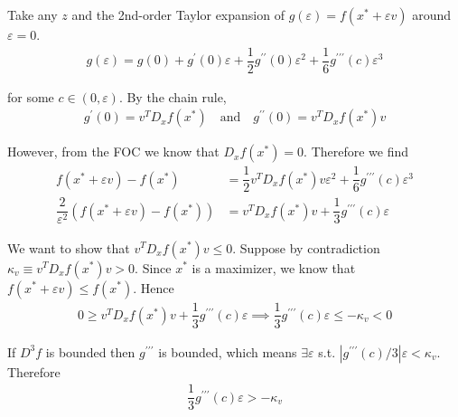 \documentclass{article}
\begin{document}
\begin{enumerate}[1.]
\begin{enumerate}[a)]
        \solution Take any $z$ and the 2nd-order Taylor expansion of $g(\varepsilon) = f(x^* + \varepsilon v)$ around $\varepsilon = 0$.
        \begin{align*}
          g(\varepsilon)
          =
          g(0)
          + g^\prime(0) \varepsilon
          + \dfrac{1}{2} g^{\prime\prime}(0) \varepsilon^2
          + \dfrac{1}{6} g^{\prime\prime\prime}(c) \varepsilon^3
        \end{align*}

        for some $c \in (0, \varepsilon)$. By the chain rule,
        \begin{align*}
          g^{\prime}(0)
          =
          v^T D_x f(x^*)
          \quad\text{and}\quad
          g^{\prime\prime}(0)
          =
          v^T D_x f(x^*) v
        \end{align*}

        However, from the FOC we know that $D_x f(x^*) = 0$.  Therefore we find
        \begin{align*}
          f(x^* + \varepsilon v) - f(x^*)
          &
          =
          \dfrac{1}{2} v^T D_x f(x^*) v \varepsilon^2
          + \dfrac{1}{6} g^{\prime\prime\prime}(c) \varepsilon^3
          \\
          \dfrac{2}{\varepsilon^2}
          \left(
            f(x^* + \varepsilon v) - f(x^*)
          \right)
          &
          =
          v^T D_x f(x^*) v
          +
          \dfrac{1}{3} g^{\prime\prime\prime}(c) \varepsilon
        \end{align*}

        We want to show that $v^T D_x f(x^*) v \le 0$. Suppose by contradiction $\kappa_v \equiv v^T D_x f(x^*) v > 0$. Since $x^*$ is a maximizer, we know that $f(x^* + \varepsilon v) \le f(x^*)$. Hence
        \begin{align*}
          0
          \ge
          v^T D_x f(x^*) v
          +
          \dfrac{1}{3} g^{\prime\prime\prime}(c) \varepsilon
          \implies
          \dfrac{1}{3} g^{\prime\prime\prime}(c) \varepsilon
          \le
          - \kappa_v
          <
          0
        \end{align*}

        If $D^3 f$ is bounded then $g^{\prime\prime\prime}$ is bounded, which means $\exists \varepsilon$ s.t. $|g^{\prime\prime\prime}(c) / 3| \varepsilon < \kappa_v$. Therefore
        \begin{align*}
          \dfrac{1}{3} g^{\prime\prime\prime}(c) \varepsilon
          >
          - \kappa_v
        \end{align*}


\end{enumerate}
\end{enumerate}
\end{document}
